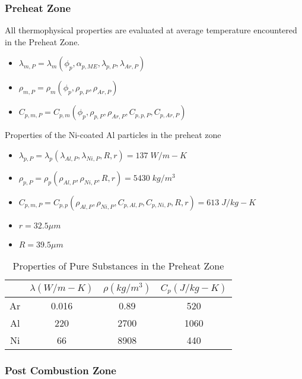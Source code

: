 \documentclass[../main.tex]{subfiles}
\begin{document}
\subsubsection{Preheat Zone}

All thermophysical properties are evaluated at average temperature encountered in the Preheat Zone.

\begin{itemize}
    \item $\lambda_{m,P} = \lambda_m \left( \phi_p, \alpha_{p,ME}, \lambda_{p,P}, \lambda_{Ar,P} \right)$
    \item $\rho_{m,P} = \rho_m \left( \phi_p, \rho_{p,P}, \rho_{Ar,P} \right)$
    \item $C_{p,m,P} = C_{p,m} \left( \phi_p, \rho_{p,P}, \rho_{Ar,P}, C_{p,p,P}, C_{p,Ar,P} \right)$
\end{itemize}

\noindent Properties of the Ni-coated Al particles in the preheat zone

\begin{itemize}
    \item $\lambda_{p,P} = \lambda_p \left( \lambda_{Al,P}, \lambda_{Ni,P}, R, r \right) = 137\;W/m-K$
    \item $\rho_{p,P} = \rho_p \left( \rho_{Al,P}, \rho_{Ni,P}, R, r \right) = 5430\;kg/m^3$
    \item $C_{p,m,P} = C_{p,p} \left( \rho_{Al,P}, \rho_{Ni,P}, C_{p,Al,P}, C_{p,Ni,P}, R, r \right) = 613\;J/kg-K$
    \item $r = 32.5 \mu m$
    \item $R = 39.5 \mu m$
\end{itemize}

\begin{table}[ht]
    \centering
    \begin{tabular}{c|c|c|c}
         & $\lambda \left( W/m-K \right)$ & $\rho \left( kg/m^3 \right)$ & $C_p \left( J/kg-K \right)$ \\
         \hline
         Ar & 0.016 & 0.89 & 520  \\
         Al & 220   & 2700 & 1060 \\
         Ni & 66    & 8908 & 440  \\
    \end{tabular}
    \caption{Properties of Pure Substances in the Preheat Zone}
    \label{tab:my_label}
\end{table}

\subsubsection{Post Combustion Zone}
\end{document}

